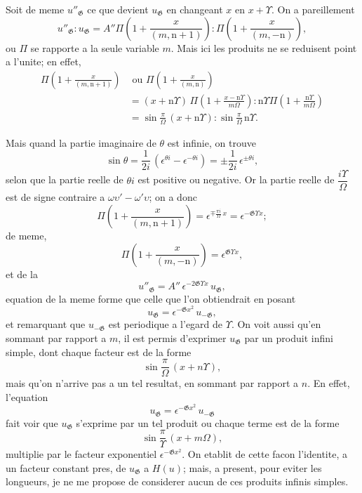 \documentclass[11pt,a4paper]{book}
\begin{document}
Soit de meme $u''_{\mathfrak{G}}$ ce que devient $u_{\mathfrak{G}}$ en changeant $x$ en $x + \Upsilon$. On a pareillement
\[u''_{\mathfrak{G}} : u_{\mathfrak{G}} = A''\Pi\left(1 + \frac{x}{(m, \mathrm{n}+1)}\right) : \Pi\left(1 + \frac{x}{(m, -\mathrm{n})}\right),\]
ou $\Pi$ se rapporte a la seule variable $m$. Mais ici les produits ne se reduisent point
a l'unite; en effet,
\begin{align*}
\Pi\left(1 + \frac{x}{(m, \mathrm{n}+1)}\right) &\text{ ou } \Pi\left(1 + \frac{x}{(m, \mathrm{n})}\right)\\
&= (x + \mathrm{n}\Upsilon)\, \Pi\left(1 + \frac{x - \mathrm{n}\Upsilon}{m\Omega}\right) : \mathrm{n}\Upsilon\Pi\left(1 + \frac{\mathrm{n}\Upsilon}{m\Omega}\right)\\
&= \sin\frac{\pi}{\Omega}\, (x + \mathrm{n}\Upsilon) : \sin\frac{\pi}{\Omega}\, \mathrm{n}\Upsilon.
\end{align*}

Mais quand la partie imaginaire de $\theta$ est infinie, on trouve
\[\sin\theta = \frac{1}{2i}\, (\epsilon^{\theta i} - \epsilon^{-\theta i}) = \pm \frac{1}{2i}\, \epsilon^{\pm\theta i},\]
selon que la partie reelle de $\theta i$ est positive ou negative. Or la partie reelle de $\dfrac{i\Upsilon}{\Omega}$
est de signe contraire a $\omega\upsilon' - \omega'\upsilon$; on a donc
\[\Pi\left(1 + \frac{x}{(m, \mathrm{n}+1)}\right) = \epsilon^{\mp \frac{\pi i}{\Omega}\, x} = \epsilon^{-\mathfrak{G}\Upsilon x};\]
de meme,
\[\Pi\left(1 + \frac{x}{(m, -\mathrm{n})}\right) = \epsilon^{\mathfrak{G}\Upsilon x},\]
et de la
\begin{equation}
u''_{\mathfrak{G}} = A''\, \epsilon^{-2\mathfrak{G}\Upsilon x}\, u_{\mathfrak{G}}, \tag{19}
\end{equation}
equation de la meme forme que celle que l'on obtiendrait en posant
\[u_{\mathfrak{G}} = \epsilon^{-\mathfrak{G}x^2}\, u_{-\mathfrak{G}},\]
et remarquant que $u_{-\mathfrak{G}}$ est periodique a l'egard de $\Upsilon$. On voit aussi qu'en sommant
par rapport a $m$, il est permis d'exprimer $u_{\mathfrak{G}}$ par un produit infini simple, dont chaque
facteur est de la forme
\[\sin\frac{\pi}{\Omega}\, (x + n\Upsilon),\]
mais qu'on n'arrive pas a un tel resultat, en sommant par rapport a $n$. En effet,
l'equation
\[u_{\mathfrak{G}} = \epsilon^{-\mathfrak{G}x^2}\, u_{-\mathfrak{G}}\]
fait voir que $u_{\mathfrak{G}}$ s'exprime par un tel produit ou chaque terme est de la forme
\[\sin\frac{\pi}{\Upsilon}\, (x + m\Omega),\]
multiplie par le facteur exponentiel $\epsilon^{-\mathfrak{G}x^2}$. On etablit de cette facon l'identite, a un
facteur constant pres, de $u_{\mathfrak{G}}$ a $H(u)$; mais, a present, pour eviter les longueurs, je
ne me propose de considerer aucun de ces produits infinis simples.
\end{document}
